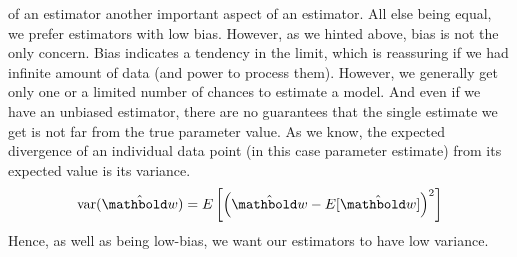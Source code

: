 of an estimator another important aspect
of an estimator.
All else being equal, we prefer estimators with low bias.
However, as we hinted above, bias is not the only concern.
Bias indicates a tendency in the limit,
which is reassuring if we had infinite amount of data
(and power to process them).
However, we generally get only one or a limited number of chances
to estimate a model.
And even if we have an unbiased estimator,
there are no guarantees that the single estimate we get
is not far from the true parameter value.
As we know, the expected divergence of an individual data point
(in this case parameter estimate) from its expected value
is its variance.
\begin{equation*}
        \text{var}(\hat{\vect{w}}) = 
        E\left[\left(\hat{\vect{w}} - E[\hat{\vect{w}}]\right)^{2}\right]
\end{equation*}
Hence, as well as being low-bias,
we want our estimators to have low variance.

